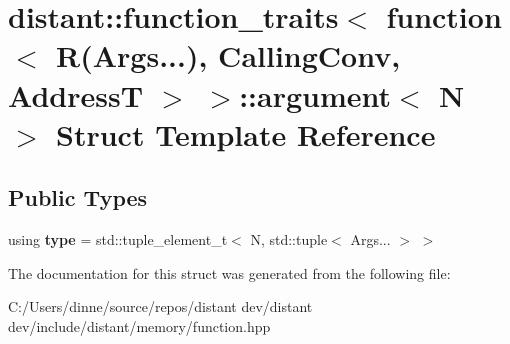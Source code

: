 \hypertarget{structdistant_1_1function__traits_3_01function_3_01_r_07_args_8_8_8_08_00_01_calling_conv_00_01_address_t_01_4_01_4_1_1argument}{}\section{distant\+:\+:function\+\_\+traits$<$ function$<$ R(Args...), Calling\+Conv, AddressT $>$ $>$\+:\+:argument$<$ N $>$ Struct Template Reference}
\label{structdistant_1_1function__traits_3_01function_3_01_r_07_args_8_8_8_08_00_01_calling_conv_00_01_address_t_01_4_01_4_1_1argument}
\subsection*{Public Types}
\begin{DoxyCompactItemize}
\item 
\mbox{\label{structdistant_1_1function__traits_3_01function_3_01_r_07_args_8_8_8_08_00_01_calling_conv_00_01_address_t_01_4_01_4_1_1argument_a227914de4a3cd9b3b25f181fe6b1010e}} 
using {\bfseries type} = std\+::tuple\+\_\+element\+\_\+t$<$ N, std\+::tuple$<$ Args... $>$ $>$
\end{DoxyCompactItemize}


The documentation for this struct was generated from the following file\+:\begin{DoxyCompactItemize}
\item 
C\+:/\+Users/dinne/source/repos/distant dev/distant dev/include/distant/memory/function.\+hpp\end{DoxyCompactItemize}
